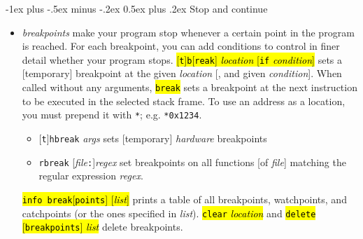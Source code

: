 \documentclass[a4paper,landscape]{article}
\makeatletter
\renewcommand{\section}{\@startsection{section}{1}{0mm}%
                                {-1ex plus -.5ex minus -.2ex}%
                                {0.5ex plus .2ex}%
                                {\normalfont\large\bfseries}}
\makeatother
\begin{document}
\begin{multicols*}{3}
\section{Stop and continue}
\begin{itemize}
\item \emph{breakpoints} make your program stop whenever a certain point in the program is reached.  For each breakpoint, you can add conditions to control in finer detail whether your program stops.
\hl{[\texttt{t}]\texttt{b}[\texttt{reak}] \textit{location} [\texttt{if} \textit{condition}]} sets a [temporary] breakpoint at the given \textit{location} [, and given \textit{condition}]. When called without any arguments, \hl{\texttt{break}} sets a breakpoint at the next instruction to be executed in the selected stack frame. To use an address as a location, you must prepend it with \texttt{*}; e.g. \texttt{*0x1234}.
	\begin{itemize}
	\item {}[\texttt{t}]\texttt{hbreak} \textit{args} sets [temporary] \emph{hardware} breakpoints
	\item \texttt{rbreak} [\textit{file}\texttt{:}]\textit{regex} set breakpoints on all functions [of \textit{file}] matching the regular expression \textit{regex}.
	\end{itemize}
\hl{\texttt{info break}[\texttt{points}] [\textit{list}]} prints a table of all breakpoints, watchpoints, and catchpoints (or the ones specified in \textit{list}).
\hl{\texttt{clear} \textit{location}} and \hl{\texttt{delete} [\texttt{breakpoints}] \textit{list}} delete breakpoints.


\end{itemize}
\end{multicols*}
\end{document}
